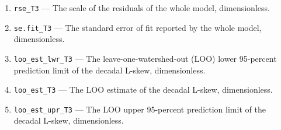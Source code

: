 \documentclass[1p, authoryear, 11pt, times, preprint]{elsarticle}
\newcommand{\code}[1]{{\color{black}%
                       \mbox{\lstinline[basicstyle={\small\ttfamily},
                                        keywordstyle=\scriptsize\ttfamily]|#1|}}}
\begin{document}
\begin{enumerate}
\item \code{rse_T3} --- The scale of the residuals of the whole model, dimensionless.
\item \code{se.fit_T3} --- The standard error of fit reported by the whole model, dimensionless.
\item \code{loo_est_lwr_T3} --- The leave-one-watershed-out (LOO) lower 95-percent prediction limit of the decadal L-skew, dimensionless.
\item \code{loo_est_T3} --- The LOO estimate of the decadal L-skew, dimensionless.
\item \code{loo_est_upr_T3} --- The LOO upper 95-percent prediction limit of the decadal  L-skew, dimensionless.
\end{enumerate}


\end{document}
